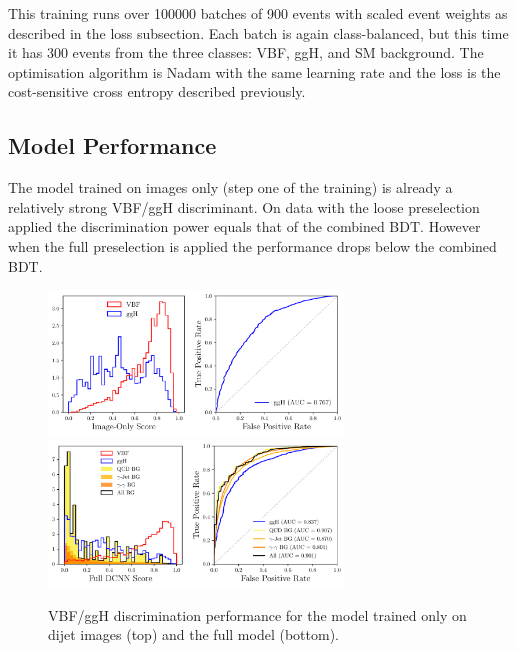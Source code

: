 This training runs over 100000 batches of 900 events with scaled event weights as described in the loss subsection. Each batch is again class-balanced, but this time it has 300 events from the three classes: VBF, ggH, and SM background. 
The optimisation algorithm is Nadam with the same learning rate and the loss is the cost-sensitive cross entropy described previously. 














\subsection{Model Performance}
The model trained on images only (step one of the training) is already a relatively strong VBF/ggH discriminant. 
On data with the loose preselection applied the discrimination power equals that of the combined BDT. 
However when the full preselection is applied the performance drops below the combined BDT. 
\begin{figure}[h!]
    \includegraphics[width=0.7\textwidth]{figures/event_selection/imgonly_DCNN_PS.pdf}
    \includegraphics[width=0.7\textwidth]{figures/event_selection/full_DCNN_PS.pdf}
    \caption{VBF/ggH discrimination performance for the model trained only on dijet images (top) and the full model (bottom).}
    \label{fig:event_categorisation:image_only_DCNN}
\end{figure}

